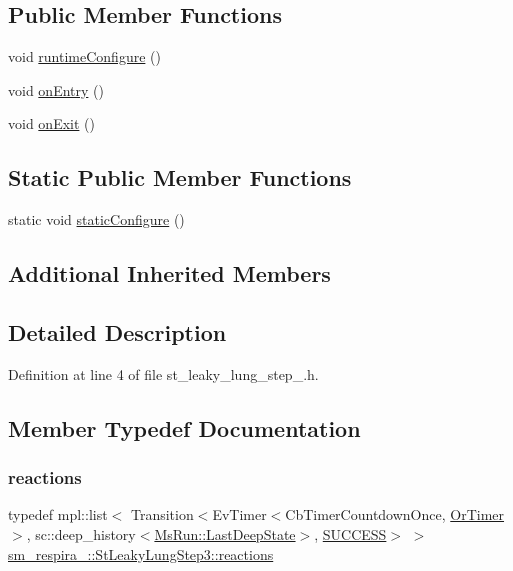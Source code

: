 \subsection*{Public Member Functions}
\begin{DoxyCompactItemize}
\item 
void \hyperlink{structsm__respira__1_1_1StLeakyLungStep3_abea67094aaff8b69c96f478914165c8f}{runtime\+Configure} ()
\item 
void \hyperlink{structsm__respira__1_1_1StLeakyLungStep3_a3e1a20f54d35bc8d6a8add4a7815907e}{on\+Entry} ()
\item 
void \hyperlink{structsm__respira__1_1_1StLeakyLungStep3_ae10c075f4084328d4b17c918225ab7d1}{on\+Exit} ()
\end{DoxyCompactItemize}
\subsection*{Static Public Member Functions}
\begin{DoxyCompactItemize}
\item 
static void \hyperlink{structsm__respira__1_1_1StLeakyLungStep3_a43d0e0d80ec8436ff14252691ab19a83}{static\+Configure} ()
\end{DoxyCompactItemize}
\subsection*{Additional Inherited Members}


\subsection{Detailed Description}


Definition at line 4 of file st\+\_\+leaky\+\_\+lung\+\_\+step\+\_.\+h.



\subsection{Member Typedef Documentation}
\mbox{\label{structsm__respira__1_1_1StLeakyLungStep3_a6a3e225a1e266d477eb4821fcf9d0658}} 
\subsubsection{\texorpdfstring{reactions}{reactions}}
{\footnotesize\ttfamily typedef mpl\+::list$<$ Transition$<$Ev\+Timer$<$Cb\+Timer\+Countdown\+Once, \hyperlink{classsm__respira__1_1_1OrTimer}{Or\+Timer}$>$, sc\+::deep\+\_\+history$<$\hyperlink{classsmacc_1_1SmaccState_a60088405d2d99d468caa0baa3b2830a8}{Ms\+Run\+::\+Last\+Deep\+State}$>$, \hyperlink{classSUCCESS}{S\+U\+C\+C\+E\+SS}$>$ $>$ \hyperlink{structsm__respira__1_1_1StLeakyLungStep3_a6a3e225a1e266d477eb4821fcf9d0658}{sm\+\_\+respira\+\_\+::\+St\+Leaky\+Lung\+Step3\+::reactions}}



